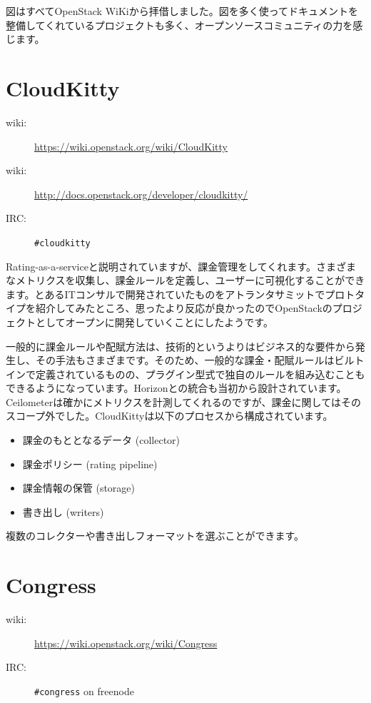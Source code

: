 図はすべてOpenStack WiKiから拝借しました。図を多く使ってドキュメントを整備してくれているプロジェクトも多く、オープンソースコミュニティの力を感じます。

\section{CloudKitty}

\begin{description}
	\item[wiki:] \url{https://wiki.openstack.org/wiki/CloudKitty}
	\item[wiki:] \url{http://docs.openstack.org/developer/cloudkitty/}
	\item[IRC:] \verb|#cloudkitty|
\end{description}

Rating-as-a-serviceと説明されていますが、課金管理をしてくれます。さまざまなメトリクスを収集し、課金ルールを定義し、ユーザーに可視化することができます。とあるITコンサルで開発されていたものをアトランタサミットでプロトタイプを紹介してみたところ、思ったより反応が良かったのでOpenStackのプロジェクトとしてオープンに開発していくことにしたようです。

一般的に課金ルールや配賦方法は、技術的というよりはビジネス的な要件から発生し、その手法もさまざまです。そのため、一般的な課金・配賦ルールはビルトインで定義されているものの、プラグイン型式で独自のルールを組み込むこともできるようになっています。Horizonとの統合も当初から設計されています。Ceilometerは確かにメトリクスを計測してくれるのですが、課金に関してはそのスコープ外でした。CloudKittyは以下のプロセスから構成されています。

\begin{itemize}
	\item 課金のもととなるデータ (collector)
	\item 課金ポリシー (rating pipeline)
	\item 課金情報の保管 (storage)
	\item 書き出し (writers)
\end{itemize}

複数のコレクターや書き出しフォーマットを選ぶことができます。

\section{Congress}

\begin{description}
	\item[wiki:] \url{https://wiki.openstack.org/wiki/Congress}
	\item[IRC:] \verb|#congress| on freenode
\end{description}

